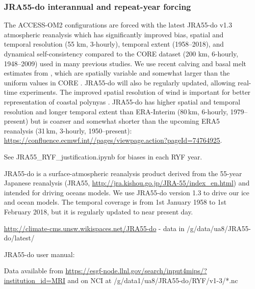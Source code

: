\documentclass[11pt]{article}
\begin{document}
\subsubsection{JRA55-do interannual and repeat-year forcing}

The ACCESS-OM2 configurations are forced with the latest JRA55-do v1.3 atmospheric reanalysis \citep{TsujinoETAL2018a} which has significantly improved bias, spatial and temporal resolution (55 km, 3-hourly), temporal extent (1958--2018), and dynamical self-consistency compared to the CORE dataset (200 km, 6-hourly, 1948--2009) used in many previous studies. We use recent calving and basal melt estimates from \citet{DepoorterBamberGriggsLenaertsLigtenbergBroekeMoholdt2013a}, which are spatially variable and somewhat larger than the uniform values in CORE \citep{TsujinoETAL2018a}. JRA55-do will also be regularly updated, allowing real-time experiments. The improved spatial resolution of wind is important for better representation of coastal polynyas \citep{StosselZhangVihma2011a, ZhangVihmaStosselUotila2015a}.
JRA55-do has higher spatial and temporal resolution and longer temporal extent than ERA-Interim (80\,km, 6-hourly, 1979--present) %
but is coarser and somewhat shorter than the upcoming ERA5 reanalysis (31\,km, 3-hourly, 1950--present): \url{https://confluence.ecmwf.int//pages/viewpage.action?pageId=74764925}.%


See JRA55_RYF_justification.ipynb for biases in each RYF year.

JRA55-do \citep{TsujinoETAL2018a} is a surface-atmospheric reanalysis product derived from the 55-year Japanese reanalysis (JRA55, \url{http://jra.kishou.go.jp/JRA-55/index_en.html}) and intended for driving oceans models. 
We use JRA55-do version 1.3 to drive our ice and ocean models.
The temporal coverage is from 1st January 1958 to 1st February 2018, but it is regularly updated to near present day.



\url{http://climate-cms.unsw.wikispaces.net/JRA55-do} - data in /g/data/ua8/JRA55-do/latest/

JRA55-do user manual: \citet{TsujinoUrakawaNakanoSmallKimYeagerDanabasogluSuzukiBamber2018a}

Data available from \url{https://esgf-node.llnl.gov/search/input4mips/?institution_id=MRI}
and on NCI at /g/data1/ua8/JRA55-do/RYF/v1-3/*.nc
\end{document}
